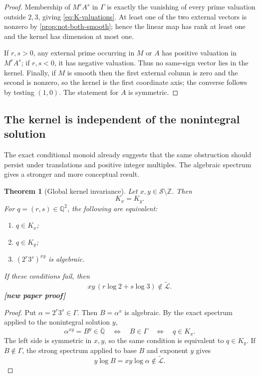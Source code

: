 \documentclass[11pt,oneside]{article}
\newtheorem{theorem}{Theorem}[section]
\theoremstyle{definition}
\theoremstyle{remark}
\newcommand{\Z}{\mathbb Z}
\newcommand{\Q}{\mathbb Q}
\newcommand{\Qbar}{\overline{\mathbb Q}}
\newcommand{\Sol}{\mathcal S}
\newcommand{\LL}{\widetilde{\mathcal L}}
\newcommand{\statusnew}{\textcolor{NewViolet}{\textbf{[new paper proof]}}}
\begin{document}
\begin{proof}
Membership of $M^rA^s$ in $\Gamma$ is exactly the vanishing of every prime valuation outside
$2,3$, giving \eqref{eq:K-valuations}.  At least one of the two external vectors is nonzero by
\cref{prop:not-both-smooth}; hence the linear map has rank at least one and the kernel has
dimension at most one.

If $r,s>0$, any external prime occurring in $M$ or $A$ has positive valuation in $M^rA^s$; if
$r,s<0$, it has negative valuation.  Thus no same-sign vector lies in the kernel.  Finally, if
$M$ is smooth then the first external column is zero and the second is nonzero, so the kernel
is the first coordinate axis; the converse follows by testing $(1,0)$.  The statement for
$A$ is symmetric.
\end{proof}

\subsection{The kernel is independent of the nonintegral solution}

The exact conditional monoid already suggests that the same obstruction should persist under
translations and positive integer multiples.  The algebraic spectrum gives a stronger and
more conceptual result.

\begin{theorem}[Global kernel invariance]\label{thm:K-invariant}
Let $x,y\in\Sol\setminus\Z$.  Then
\[
  K_x=K_y.
\]
For $q=(r,s)\in\Q^2$, the following are equivalent:
\begin{enumerate}
\item $q\in K_x$;
\item $q\in K_y$;
\item $(2^r3^s)^{xy}$ is algebraic.
\end{enumerate}
If these conditions fail, then
\[
  xy\,(r\log2+s\log3)\notin\LL.
                                                        \tag{8.3}\label{eq:strong-mixed}
\]
\statusnew
\end{theorem}

\begin{proof}
Put $\alpha=2^r3^s\in\Gamma$.  Then $B=\alpha^x$ is algebraic.  By the exact spectrum applied
to the nonintegral solution $y$,
\[
  \alpha^{xy}=B^y\in\Qbar
  \quad\Longleftrightarrow\quad
  B\in\Gamma
  \quad\Longleftrightarrow\quad
  q\in K_x.
\]
The left side is symmetric in $x,y$, so the same condition is equivalent to $q\in K_y$.
If $B\notin\Gamma$, the strong spectrum applied to base $B$ and exponent $y$ gives
\[
 y\log B=xy\log\alpha\notin\LL.
\]
\end{proof}
\end{document}
